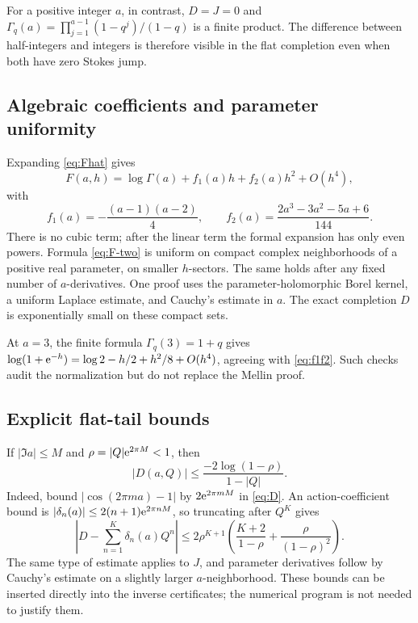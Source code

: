 \documentclass[11pt,a4paper]{article}
\numberwithin{equation}{section}
\theoremstyle{definition}
\theoremstyle{remark}\newtheorem{remark}[theorem]{Remark}
\begin{document}
For a positive integer $a$, in contrast, $D=J=0$ and
$\Gamma_q(a)=\prod_{j=1}^{a-1}(1-q^j)/(1-q)$ is a finite product.
The difference between half-integers and integers is therefore visible
in the flat completion even when both have zero Stokes jump.

\subsection{Algebraic coefficients and parameter uniformity}
Expanding \eqref{eq:Fhat} gives
\begin{equation}\label{eq:F-two}
 F(a,h)=\log\Gamma(a)+f_1(a)h+f_2(a)h^2+O(h^4),
\end{equation}
with
\begin{equation}\label{eq:f1f2}
 f_1(a)=-\frac{(a-1)(a-2)}4,
 \qquad f_2(a)=\frac{2a^3-3a^2-5a+6}{144}.
\end{equation}
There is no cubic term; after the linear term the formal expansion has
only even powers. Formula \eqref{eq:F-two} is uniform on compact complex
neighborhoods of a positive real parameter, on smaller $h$-sectors.
The same holds after any fixed number of $a$-derivatives. One proof
uses the parameter-holomorphic Borel kernel, a uniform Laplace estimate,
and Cauchy's estimate in $a$. The exact completion $D$ is exponentially
small on these compact sets.

At $a=3$, the finite formula $\Gamma_q(3)=1+q$ gives
$\log(1+\mathrm e^{-h})=\log2-h/2+h^2/8+O(h^4)$, agreeing with
\eqref{eq:f1f2}. Such checks audit the normalization but do not replace
the Mellin proof.

\subsection{Explicit flat-tail bounds}
If $|\Im a|\le M$ and $\rho=|Q|\mathrm e^{2\pi M}<1$, then
\begin{equation}\label{eq:D-bound}
 |D(a,Q)|\le\frac{-2\log(1-\rho)}{1-|Q|}.
\end{equation}
Indeed, bound $|\cos(2\pi ma)-1|$ by $2\mathrm e^{2\pi mM}$ in
\eqref{eq:D}. An action-coefficient bound is
$|\delta_n(a)|\le2(n+1)\mathrm e^{2\pi nM}$, so truncating after $Q^K$ gives
\begin{equation}\label{eq:D-tail}
 \left|D-\sum_{n=1}^{K}\delta_n(a)Q^n\right|
 \le2\rho^{K+1}\left(\frac{K+2}{1-\rho}
                         +\frac{\rho}{(1-\rho)^2}\right).
\end{equation}
The same type of estimate applies to $J$, and parameter derivatives
follow by Cauchy's estimate on a slightly larger $a$-neighborhood.
These bounds can be inserted directly into the inverse certificates;
the numerical program is not needed to justify them.
\end{document}

